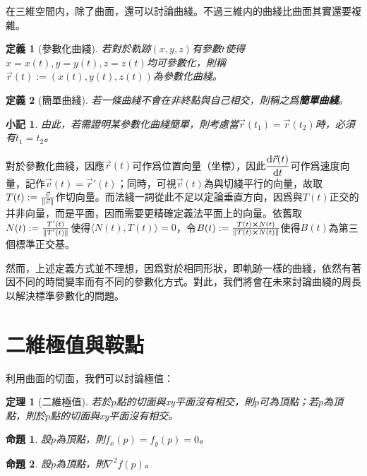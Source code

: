 \documentclass[12pt]{article}
\newcommand{\innerprod}[2]{\langle{#1},{#2}\rangle}
\newtheorem{definition}{定義}
\newtheorem*{theorem}{定理}
\newtheorem*{proposition}{命題}
\newtheorem*{remark}{小記}
\begin{document}
    在三維空間内，除了曲面，還可以討論曲綫。不過三維内的曲綫比曲面其實還要複雜。

    \begin{definition}[參數化曲綫]
        若對於軌跡$(x,y,z)$有參數$t$使得$x=x(t),y=y(t),z=z(t)$均可參數化，則稱$\vec{r}(t):=(x(t),y(t),z(t))$為參數化曲綫。
    \end{definition}

    \begin{definition}[簡單曲綫]
        若一條曲綫不會在非終點與自己相交，則稱之爲\textbf{簡單曲綫}。
    \end{definition}

    \begin{remark}
        由此，若需證明某參數化曲綫簡單，則考慮當$\vec{r}(t_1)=\vec{r}(t_2)$時，必須有$t_1=t_2$。
    \end{remark}

    對於參數化曲綫，因應$\vec{r}(t)$可作爲位置向量（坐標），因此$\displaystyle \derivative{\vec{r}(t)}{t}$可作爲速度向量，記作$\vec{v}(t)=\vec{r}'(t)$；同時，可視$\vec{v}(t)$為與切綫平行的向量，故取$T(t):=\frac{\vec{v}}{\norm*{\vec{v}}}$作切向量。而法綫一詞從此不足以定論垂直方向，因爲與$T(t)$正交的并非向量，而是平面，因而需要更精確定義法平面上的向量。依舊取$N(t):=\frac{T'(t)}{\norm*{T'(t)}}$使得$\innerprod{N(t)}{T(t)}=0$，令$B(t):=\frac{T(t)\cross N(t)}{\norm*{T(t)\cross N(t)}}$使得$B(t)$為第三個標準正交基。

    然而，上述定義方式並不理想，因爲對於相同形狀，即軌跡一樣的曲綫，依然有著因不同的時間變率而有不同的參數化方式。對此，我們將會在未來討論曲綫的周長以解決標準參數化的問題。

    \section*{二維極值與鞍點}

    利用曲面的切面，我們可以討論極值：

    \begin{theorem}[二維極值]
        若於$p$點的切面與xy平面沒有相交，則$p$可為頂點；若$p$為頂點，則於$p$點的切面與xy平面沒有相交。
    \end{theorem}

    \begin{proposition}
        設$p$為頂點，則$f_x(p)=f_y(p)=0$。
    \end{proposition}

    \begin{proposition}
        設$p$為頂點，則$\nabla^2 f(p)$。
    \end{proposition}
\end{document}
